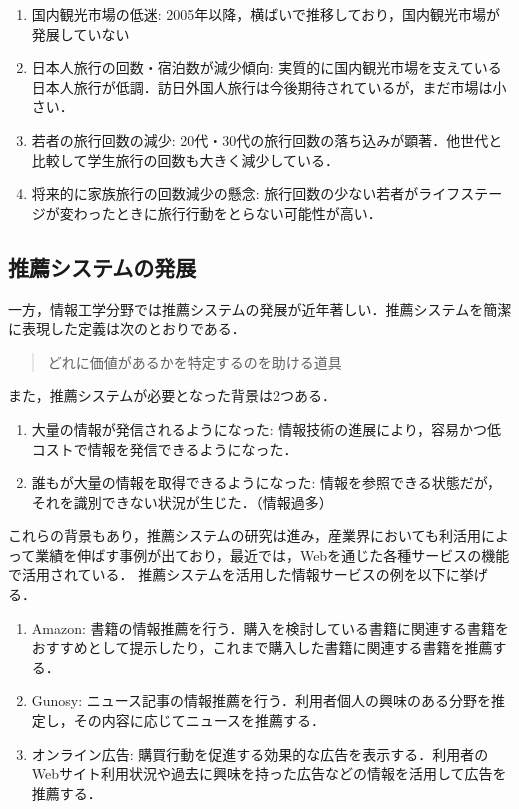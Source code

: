 \documentclass{jsarticle}
\begin{document}
\begin{enumerate}
\item 国内観光市場の低迷: 2005年以降，横ばいで推移しており，国内観光市場が発展していない
\item 日本人旅行の回数・宿泊数が減少傾向: 実質的に国内観光市場を支えている日本人旅行が低調．訪日外国人旅行は今後期待されているが，まだ市場は小さい．
\item 若者の旅行回数の減少: 20代・30代の旅行回数の落ち込みが顕著．他世代と比較して学生旅行の回数も大きく減少している．
\item 将来的に家族旅行の回数減少の懸念: 旅行回数の少ない若者がライフステージが変わったときに旅行行動をとらない可能性が高い．
\end{enumerate}

\subsection{推薦システムの発展}
\label{evolution_recommendation_system}

一方，情報工学分野では推薦システムの発展が近年著しい．推薦システムを簡潔に表現した定義は次のとおりである\cite{define_of_recommendation_system}．

\begin{quote}
どれに価値があるかを特定するのを助ける道具
\end{quote}

また，推薦システムが必要となった背景は2つある\cite{kamishima_recommendation}．

\begin{enumerate}
\item 大量の情報が発信されるようになった: 情報技術の進展により，容易かつ低コストで情報を発信できるようになった．
\item 誰もが大量の情報を取得できるようになった: 情報を参照できる状態だが，それを識別できない状況が生じた．（情報過多\cite{information_overload}）
\end{enumerate}

これらの背景もあり，推薦システムの研究は進み，産業界においても利活用によって業績を伸ばす事例が出ており，最近では，Webを通じた各種サービスの機能で活用されている．
推薦システムを活用した情報サービスの例を以下に挙げる．

\begin{enumerate}
\item Amazon\cite{amazon}: 書籍の情報推薦を行う．購入を検討している書籍に関連する書籍をおすすめとして提示したり，これまで購入した書籍に関連する書籍を推薦する．
\item Gunosy\cite{gunosy}: ニュース記事の情報推薦を行う．利用者個人の興味のある分野を推定し，その内容に応じてニュースを推薦する．
\item オンライン広告\cite{yahoo_ad}\cite{facebook_ad}\cite{google_ad}: 購買行動を促進する効果的な広告を表示する．利用者のWebサイト利用状況や過去に興味を持った広告などの情報を活用して広告を推薦する．
\end{enumerate}
\end{document}
